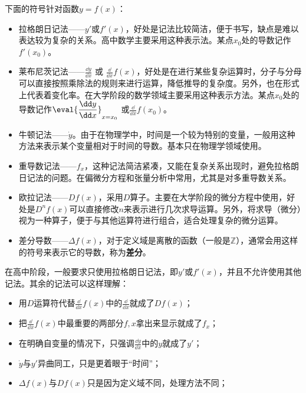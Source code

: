 下面的符号针对函数$y=f(x)$：
\begin{itemize}
\item 拉格朗日记法——$y'$或$f'(x)$，好处是记法比较简洁，便于书写，缺点是难以表达较为复杂的关系。高中数学主要采用这种表示法。某点$x_0$处的导数记作$f'(x_0)$。
\item 莱布尼茨记法——$\displaystyle\frac{\dd y}{\dd x}$  或  $\displaystyle\frac{\dd}{\dd x}f(x)$，好处是在进行某些复杂运算时，分子与分母可以直接按照乘除法的规则来进行运算，降低推导的复杂度。另外，也在形式上代表着变化率。在大学阶段的数学领域主要采用这种表示方法。某点$x_0$处的导数记作$\displaystyle\eval{\dfrac{\dd y}{\dd x}}_{x=x_0}$ 或$\displaystyle\frac{\dd}{\dd x}f(x_0)$。
\item 牛顿记法——$\dot{y}$。由于在物理学中，时间是一个较为特别的变量，一般用这种方法来表示某个变量相对于时间的导数。基本只在物理学领域使用。
\item 重导数记法——$f_x$，这种记法简洁紧凑，又能在复杂关系出现时，避免拉格朗日记法的问题。在偏微分方程和张量分析中常用，尤其是对多重导数关系。
\item 欧拉记法——$Df(x)$，采用$D$算子。主要在大学阶段的微分方程中使用，好处是$D^n f(x)$可以直接修改$n$来表示进行几次求导运算。另外，将求导（微分）视为一种算子，便于与其他运算符进行组合，适合处理复杂的微分运算。
\item 差分导数——$\Delta f(x)$，对于定义域是离散的函数（一般是$\mathbb{Z}$），通常会用这样的符号来表示它的导数，称为\textbf{差分}。
\end{itemize}

在高中阶段，一般要求只使用拉格朗日记法，即$y'$或$f'(x)$，并且不允许使用其他记法。其余的记法可以这样理解：
\begin{itemize}
\item 用$D$运算符代替$\displaystyle\frac{\dd}{\dd x}f(x)$中的$\displaystyle\frac{\dd}{\dd x}$就成了$Df(x)$；
\item 把$\displaystyle\frac{\dd}{\dd x}f(x)$中最重要的两部分$f,x$拿出来显示就成了$f_x$；
\item 在明确自变量的情况下，只强调$\displaystyle\frac{\dd y}{\dd x}$中的$y$就成了$y'$；
\item $\dot{y}$与$y'$异曲同工，只是更着眼于“时间”；
\item $\Delta f(x)$与$Df(x)$只是因为定义域不同，处理方法不同；
\end{itemize}

